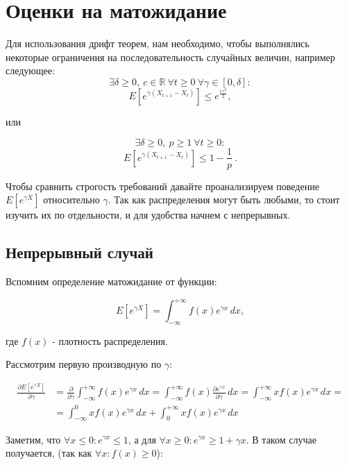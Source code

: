 \documentclass[12pt, a4paper]{article}
\title{\text{Limits}}
\date{04-08-2021}
\author{\text{Vihnin F.}}
\theoremstyle{remark}
\begin{document}
\maketitle
\newpage 

\section*{Оценки на матожидание}

Для использования дрифт теорем, нам необходимо, чтобы выполнялись некоторые ограничения на последовательность случайных величин, например следующее:
$$
\exists \delta \geq 0,\ c \in \mathbb{R} \ \forall  t \geq 0 \ \forall \gamma \in [0, \delta] : $$$$
E[e^{\gamma (X_{t + 1} - X_{t})}] \leq e^{\frac{c \gamma^2}{2}},$$

или

$$\exists \delta \geq 0,\ p \geq 1 \ \forall t \geq 0 : $$$$
E[e^{\gamma (X_{t + 1} - X_{t})}] \leq 1 - \frac{1}{p}\ .$$

Чтобы сравнить строгость требований давайте проанализируем поведение $E[e^{\gamma X}]$ относительно $\gamma$. Так как распределения могут быть любыми, то стоит изучить их по отдельности, и для удобства начнем с непрерывных. 

\subsection*{Непрерывный случай}

Вспомним определение матожидание от функции:

\[
E[e^{\gamma X}] = \int_{-\infty}^{+\infty} f(x) e^{\gamma x} \,dx,    
\]

где $f(x)$ - плотность распределения.

\hfill

Рассмотрим первую производную по $\gamma$:

\begin{align*}
\frac{\partial E[e^{\gamma X}]}{\partial \gamma} &= \frac{\partial}{\partial \gamma} \int_{-\infty}^{+\infty} f(x) e^{\gamma x} \, dx = \int_{-\infty}^{+\infty} f(x) \frac{\partial e^{\gamma x}}{\partial \gamma} \, dx = \int_{-\infty}^{+\infty} x f(x) e^{\gamma x} \, dx = \\
&= \int_{-\infty}^{0} x f(x) e^{\gamma x} \, dx + \int_{0}^{+\infty} x f(x) e^{\gamma x} \, dx
\end{align*}

Заметим, что $\forall x \leq 0 : e^{\gamma x} \leq 1$, а для $\forall x \geq 0 : e^{\gamma x} \geq 1 + \gamma x$. В таком случае получается, (так как $\forall x : f(x) \geq 0$): 
\end{document}
